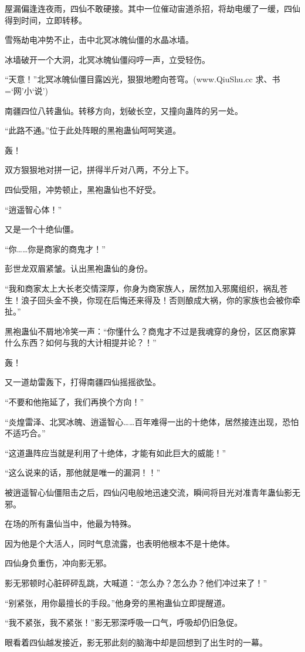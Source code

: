\begin{this_body}
屋漏偏逢连夜雨，四仙不敢硬接。其中一位催动宙道杀招，将劫电缓了一缓，四仙得到时间，立即转移。

雪殇劫电冲势不止，击中北冥冰魄仙僵的水晶冰墙。

冰墙破开一个大洞，北冥冰魄仙僵闷哼一声，立受轻伤。

“天意！”北冥冰魄仙僵目露凶光，狠狠地瞪向苍穹。(www.QiuShu.cc 求、书=‘网’小‘说’)

南疆四位八转蛊仙。转移方向，划破长空，又撞向蛊阵的另一处。

“此路不通。”位于此处阵眼的黑袍蛊仙呵呵笑道。

轰！

双方狠狠地对拼一记，拼得半斤对八两，不分上下。

四仙受阻，冲势顿止，黑袍蛊仙也不好受。

“逍遥智心体！”

又是一个十绝仙僵。

“你……你是商家的商鬼才！”

彭世龙双眉紧皱。认出黑袍蛊仙的身份。

“我和商家太上大长老交情深厚，你身为商家族人，居然加入邪魔组织，祸乱苍生！浪子回头金不换，你现在后悔还来得及！否则酿成大祸，你的家族也会被你牵扯。”

黑袍蛊仙不屑地冷笑一声：“你懂什么？商鬼才不过是我魂穿的身份，区区商家算什么东西？如何与我的大计相提并论？！”

轰！

又一道劫雷轰下，打得南疆四仙摇摇欲坠。

“不要和他拖延了，我们再换个方向！”

“炎煌雷泽、北冥冰魄、逍遥智心……百年难得一出的十绝体，居然接连出现，恐怕不适巧合。”

“这道蛊阵应当就是利用了十绝体，才能有如此巨大的威能！”

“这么说来的话，那他就是唯一的漏洞！！”

被逍遥智心仙僵阻击之后，四仙闪电般地迅速交流，瞬间将目光对准青年蛊仙影无邪。

在场的所有蛊仙当中，他最为特殊。

因为他是个大活人，同时气息流露，也表明他根本不是十绝体。

四仙身负重伤，冲向影无邪。

影无邪顿时心脏砰砰乱跳，大喊道：“怎么办？怎么办？他们冲过来了！”

“别紧张，用你最擅长的手段。”他身旁的黑袍蛊仙立即提醒道。

“我不紧张，我不紧张！”影无邪深呼吸一口气，呼吸却仍旧急促。

眼看着四仙越发接近，影无邪此刻的脑海中却是回想到了出生时的一幕。


\end{this_body}
